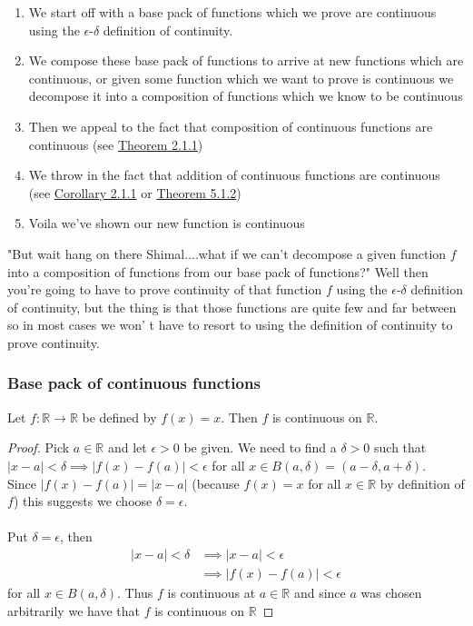 	 
	 \begin{enumerate}
	 	\item We start off with a base pack of functions which we prove are continuous using the  $\epsilon$-$\delta$ definition of continuity. 
	 	\item We compose these base pack of functions to arrive at new functions which are continuous, or given some function which we want to prove is continuous we decompose it into a composition of functions which we know to be continuous
	 	\item Then we appeal to the fact that composition of continuous functions are continuous (see \hyperlink{composition-continuity}{Theorem 2.1.1})
	 	\item We throw in the fact that addition of continuous functions are continuous (see \hyperlink{operations-cont}{Corollary 2.1.1} or \hyperlink{multi-operations-cont}{Theorem 5.1.2})
	 	\item Voila we've shown our new function is continuous
	 \end{enumerate}
	 
	 "But wait hang on there Shimal....what if we can't decompose a given function $f$ into a composition of functions from our base pack of functions?" Well then you're going to have to prove continuity of that function $f$ using the $\epsilon$-$\delta$ definition of continuity, but the thing is that those functions are quite few and far between so in most cases we won' t have to resort to using the definition of continuity to prove continuity.
	 
	 \subsubsection{Base pack of continuous functions}
	 
	 \begin{result}
	 	Let $f : \mathbb{R} \to \mathbb{R}$ be defined by $f(x) = x$. Then $f$ is continuous on $\mathbb{R}$. 
	 \end{result}
	 
	 \begin{proof}
	 	Pick $a \in \mathbb{R}$ and let $\epsilon > 0$ be given. We need to find a $\delta > 0$ such that $|x-a| < \delta \implies |f(x)-f(a)| < \epsilon$ for all $x \in B(a, \delta) = (a- \delta, a+ \delta)$. \\
	 	
	 	Since $|f(x) - f(a)| = |x-a|$ (because $f(x) =  x$ for all $x \in \mathbb{R}$ by definition of $f$) this suggests we choose $\delta = \epsilon$. \\ \\
	 	Put $\delta = \epsilon$, then 	 	\begin{align*}	 	
		 	|x-a| < \delta &\implies |x-a| < \epsilon \\
		 	&\implies  |f(x) - f(a)| < \epsilon
	 	\end{align*}
	 	for all $x \in B(a, \delta)$. Thus $f$ is continuous at $a \in \mathbb{R}$ and since $a$ was chosen arbitrarily we have that $f$ is continuous on $\mathbb{R}$
	 \end{proof}
	 
